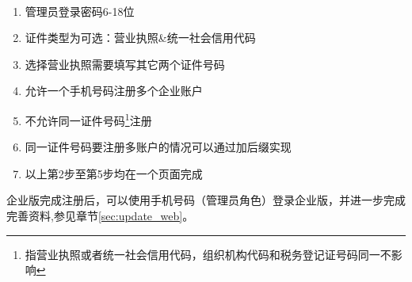 \\
\begin{enumerate}
	\item 管理员登录密码6-18位
	\item 证件类型为可选：营业执照\&统一社会信用代码
	\item 选择营业执照需要填写其它两个证件号码
	\item 允许一个手机号码注册多个企业账户
	\item 不允许同一证件号码\footnote{指营业执照或者统一社会信用代码，组织机构代码和税务登记证号码同一不影响}注册
	\item 同一证件号码要注册多账户的情况可以通过加后缀实现
  \item 以上第2步至第5步均在一个页面完成
\end{enumerate}
\par
企业版完成注册后，可以使用手机号码（管理员角色）登录企业版，并进一步完成完善资料,参见章节\ref{sec:update_web}。\par

